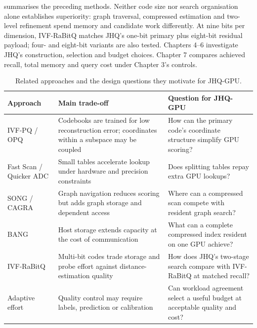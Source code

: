  summarises the preceding methods. Neither code
size nor search organisation alone establishes superiority: graph
traversal, compressed estimation and two-level refinement spend memory
and candidate work differently. At nine bits per dimension, IVF-RaBitQ
matches JHQ's one-bit primary plus eight-bit residual payload; four- and
eight-bit variants are also tested. Chapters 4--6 investigate JHQ's
construction, selection and budget choices. Chapter 7 compares achieved
recall, total memory and query cost under Chapter 3's controls.

\begin{table}[!htbp]
\centering
\caption[Related approaches and JHQ-GPU design questions]{Related approaches and the design questions they motivate for JHQ-GPU.}
\label{tab:2-position}
\footnotesize\setlength{\tabcolsep}{4pt}
\begin{tabularx}{\linewidth}{@{}>{\raggedright\arraybackslash}p{.20\linewidth}*{2}{>{\raggedright\arraybackslash}X}@{}}
\toprule
Approach & Main trade-off & Question for JHQ-GPU \\
\midrule
IVF-PQ / OPQ & Codebooks are trained for low reconstruction error; coordinates within a subspace may be coupled & How can the primary code's coordinate structure simplify GPU scoring? \\
Fast Scan / Quicker ADC & Small tables accelerate lookup under hardware and precision constraints & Does splitting tables repay extra GPU lookups? \\
SONG / CAGRA & Graph navigation reduces scoring but adds graph storage and dependent access & Where can a compressed scan compete with resident graph search? \\
BANG & Host storage extends capacity at the cost of communication & What can a complete compressed index resident on one GPU achieve? \\
IVF-RaBitQ & Multi-bit codes trade storage and probe effort against distance-estimation quality & How does JHQ's two-stage search compare with IVF-RaBitQ at matched recall? \\
Adaptive effort & Quality control may require labels, prediction or calibration & Can workload agreement select a useful budget at acceptable quality and cost? \\
\bottomrule
\end{tabularx}
\end{table}
